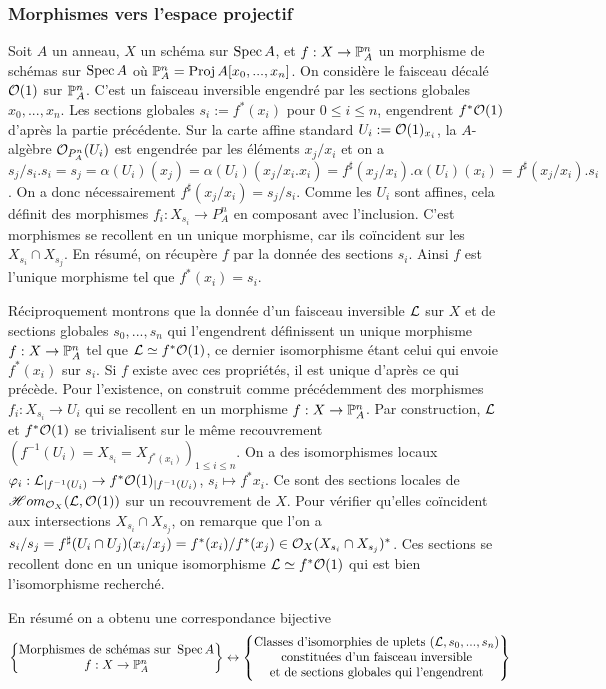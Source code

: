 \subsubsection{Morphismes vers l'espace projectif}
\label{morphismeproj}

Soit $A$ un anneau, $X$ un schéma sur $\operatorname{Spec} A$, et $f:X\rightarrow\mathbb{P}_A^n$ un morphisme de schémas sur $\operatorname{Spec} A$ où $\mathbb{P}^n_A=\operatorname{Proj} A[x_0,...,x_n]$. On considère le faisceau décalé $\mathcal{O}(1)$ sur $\mathbb{P}^n_A$. C'est un faisceau inversible engendré par les sections globales $x_0,...,x_n$. Les sections globales $s_i:=f^*(x_i)$ pour $0\leq i\leq n$, engendrent $f^*\mathcal{O}(1)$ d'après la partie précédente. Sur la carte affine standard $U_i:=\mathcal{O}(1)_{x_i}$, la $A$-algèbre $\mathcal{O}_{P^n_A}(U_i)$ est engendrée par les éléments $x_j/x_i$ et on a $s_j/s_i.s_i=s_j=\alpha(U_i)(x_j)=\alpha(U_i)(x_j/x_i.x_i)=f^\sharp(x_j/x_i).\alpha(U_i)(x_i)=f^\sharp(x_j/x_i).s_i$. On a donc nécessairement $f^\sharp(x_j/x_i)=s_j/s_i$. Comme les $U_i$ sont affines, cela définit des morphismes $f_i:X_{s_i}\rightarrow P^n_A$ en composant avec l'inclusion. C'est morphismes se recollent en un unique morphisme, car ils coïncident sur les $X_{s_i}\cap X_{s_j}$. En résumé, on récupère $f$ par la donnée des sections $s_i$. Ainsi $f$ est l'unique morphisme tel que $f^*(x_i)=s_i$.

Réciproquement montrons que la donnée d'un faisceau inversible $\mathcal{L}$ sur $X$ et de sections globales $s_0,...,s_n$ qui l'engendrent définissent un unique morphisme $f:X\rightarrow \mathbb{P}^n_A$ tel que $\mathcal{L}\simeq f^*\mathcal{O}(1)$, ce dernier isomorphisme étant celui qui envoie $f^*(x_i)$ sur $s_i$. Si $f$ existe avec ces propriétés, il est unique d'après ce qui précède. Pour l'existence, on construit comme précédemment des morphismes $f_i:X_{s_i}\rightarrow U_i$ qui se recollent en un morphisme $f:X\rightarrow \mathbb{P}^n_A$. Par construction, $\mathcal{L}$ et $f^*\mathcal{O}(1)$ se trivialisent sur le même recouvrement $(f^{-1}(U_i)=X_{s_i}=X_{f^*(x_i)})_{1\leq i\leq n}$. On a des isomorphismes locaux $\varphi_i:\mathcal{L}_{|f^{-1}(U_i)}\rightarrow f^*\mathcal{O}(1)_{|f^{-1}(U_i)}$, $s_i\mapsto f^*x_i$. Ce sont des sections locales de $\mathscr{H}om_{\mathcal{O}_X}(\mathcal{L},\mathcal{O}(1))$ sur un recouvrement de $X$. Pour vérifier qu'elles coïncident aux intersections $X_{s_i}\cap X_{s_j}$, on remarque que l'on a $s_i/s_j=f^\sharp(U_i\cap U_j)(x_i/x_j)= f^*(x_i)/f^*(x_j)\in \mathcal{O}_X(X_{s_i}\cap X_{s_j})^*$. Ces sections se recollent donc en un unique isomorphisme $\mathcal{L}\simeq f^*\mathcal{O}(1)$ qui est bien l'isomorphisme recherché.

\noindent En résumé on a obtenu une correspondance bijective
$$
\left\{
\begin{matrix}
\text{Morphismes de schémas sur } \operatorname{Spec} A\\
f:X\rightarrow \mathbb{P}_A^n
\end{matrix}
\right\}
\leftrightarrow
\left\{
\begin{matrix}
\text{Classes d'isomorphies de uplets }(\mathcal{L}, s_0,...,s_n)\\
\text{constituées d'un faisceau inversible}\\
\text{et de sections globales qui l'engendrent}
\end{matrix}
\right\}
$$


